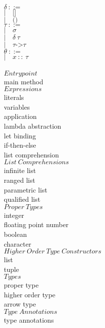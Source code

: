 ﻿\documentclass[5pt]{article}
\begin{document}
\begin{multicols}{2}
\noindent $\delta \ ::= $ \\
\hspace*{10mm} $| \quad \texttt{[]} $ \\
\hspace*{10mm} $| \quad \texttt{()} $ \\

\noindent $\tau \ ::= $ \\
\hspace*{10mm} $| \quad \sigma $ \\
\hspace*{10mm} $| \quad \delta \ \tau $ \\
\hspace*{10mm} $| \quad \tau \texttt{->} \tau $ \\

\noindent $\theta \ ::= $ \\
\hspace*{10mm} $| \quad x \ :: \  \tau $ \\
\columnbreak \\
$Entrypoint$ \\
main method \\

\noindent $Expressions$ \\
literals \\
variables \\
application \\
lambda abstraction \\
let binding \\
if-then-else \\
list comprehension \\

\noindent $List \ Comprehensions$ \\
infinite list \\
ranged list \\
parametric list \\
qualified list \\

\noindent $Proper \ Types$ \\
integer \\
floating point number \\
boolean \\
character \\

\noindent $Higher \ Order \ Type \ Constructors$ \\
list \\
tuple \\

\noindent $Types$ \\
proper type \\
higher order type \\
arrow type \\

\noindent $Type \ Annotations$ \\
type annotations \\
\end{multicols}
\end{document}

